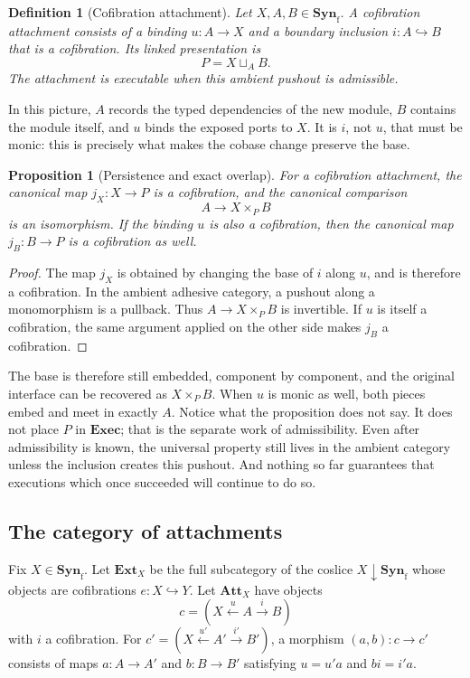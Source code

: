 \documentclass[11pt]{article}
\newtheorem{proposition}[theorem]{Proposition}
\newtheorem{definition}[theorem]{Definition}
\newcommand{\Syn}{\mathbf{Syn}}
\newcommand{\Exec}{\mathbf{Exec}}
\begin{document}
\begin{definition}[Cofibration attachment]
Let \(X,A,B\in\Syn_{\mathrm f}\).  A \emph{cofibration attachment} consists of a
binding \(u:A\to X\) and a boundary inclusion \(i:A\hookrightarrow B\) that is
a cofibration.  Its linked presentation is
\[
 P=X\sqcup_A B.
\]
The attachment is \emph{executable} when this ambient pushout is admissible.
\end{definition}

In this picture, \(A\) records the typed dependencies of the new module,
\(B\) contains the module itself, and \(u\) binds the exposed ports to \(X\).
It is \(i\), not \(u\), that must be monic: this is precisely what makes the
cobase change preserve the base.

\begin{proposition}[Persistence and exact overlap]\label{prop:persistence}
For a cofibration attachment, the canonical map
\(j_X:X\to P\) is a cofibration, and the canonical comparison
\[
 A\longrightarrow X\times_P B
\]
is an isomorphism.  If the binding \(u\) is also a cofibration, then the
canonical map \(j_B:B\to P\) is a cofibration as well.
\end{proposition}

\begin{proof}
The map \(j_X\) is obtained by changing the base of \(i\) along \(u\), and is
therefore a cofibration.  In the ambient adhesive category, a pushout along a
monomorphism is a pullback.  Thus \(A\to X\times_P B\) is invertible.  If
\(u\) is itself a cofibration, the same argument applied on the other side
makes \(j_B\) a cofibration.
\end{proof}

The base is therefore still embedded, component by component, and the original
interface can be recovered as \(X\times_P B\).  When \(u\) is monic as well,
both pieces embed and meet in exactly \(A\).  Notice what the proposition does
not say.  It does not place \(P\) in \(\Exec\); that is the separate work of
admissibility.  Even after admissibility is known, the universal property still
lives in the ambient category unless the inclusion creates this pushout.  And
nothing so far guarantees that executions which once succeeded will continue
to do so.

\subsection{The category of attachments}

Fix \(X\in\Syn_{\mathrm f}\).  Let \(\mathbf{Ext}_X\) be the full
subcategory of the coslice \(X\mathbin{\downarrow}\Syn_{\mathrm f}\) whose
objects are cofibrations \(e:X\hookrightarrow Y\).  Let
\(\mathbf{Att}_X\) have objects
\[
 c=(X\xleftarrow{u}A\xrightarrow{i}B)
\]
with \(i\) a cofibration.  For
\(c'=(X\xleftarrow{u'}A'\xrightarrow{i'}B')\), a morphism
\((a,b):c\to c'\) consists of maps \(a:A\to A'\) and \(b:B\to B'\)
satisfying \(u=u'a\) and \(bi=i'a\).
\end{document}
